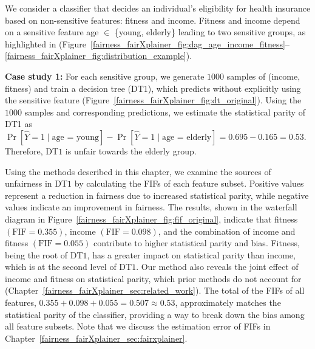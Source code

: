 \begin{example}
	\label{fairness_fairXplainer_ex:motivating_example} We consider a classifier that decides an individual's eligibility for health insurance based on non-sensitive features: fitness  and income. Fitness and income depend on a sensitive feature age $ \in $ \{young, elderly\} leading to two sensitive groups, as highlighted in (Figure~\ref{fairness_fairXplainer_fig:dag_age_income_fitness}--\ref{fairness_fairXplainer_fig:distribution_example}). 
	
	\textbf{Case study 1:} For each sensitive group, we generate $ 1000 $ samples of (income, fitness) and train a decision tree (DT$ 1 $), which predicts without explicitly using the sensitive feature (Figure~\ref{fairness_fairXplainer_fig:dt_original}). %
	Using the $1000$ samples and corresponding predictions, we estimate the statistical parity of DT1 as $ \Pr[\widehat{Y} = 1  \mid  \text{age = young} ] - \Pr[\widehat{Y} = 1  \mid  \text{age = elderly}] = 0.695 - 0.165 = 0.53 $. Therefore, DT$ 1 $ is unfair towards the elderly group.
	
	
	Using the methods described in this chapter, we examine the sources of unfairness in DT$ 1 $ by calculating the FIFs of each feature subset. Positive values represent a reduction in fairness due to increased statistical parity, while negative values indicate an improvement in fairness. The results, shown in the waterfall diagram in Figure~\ref{fairness_fairXplainer_fig:fif_original}, indicate that fitness $(\mathrm{FIF} = 0.355)$, income $(\mathrm{FIF} = 0.098)$, and the combination of income and fitness $(\mathrm{FIF} = 0.055)$ contribute to higher statistical parity and bias. Fitness, being the root of DT$ 1 $, has a greater impact on statistical parity than income, which is at the second level of DT$ 1 $. Our method also reveals the joint effect of income and fitness on statistical parity, which prior methods do not account for (Chapter~\ref{fairness_fairXplainer_sec:related_work}). The total of the FIFs of all features, $ 0.355 + 0.098 + 0.055 = 0.507 \approx 0.53 $, approximately matches the statistical parity of the classifier, providing a way to break down the bias among all feature subsets. Note that we discuss the estimation error of FIFs in Chapter~\ref{fairness_fairXplainer_sec:fairxplainer}.
	

\end{example}
